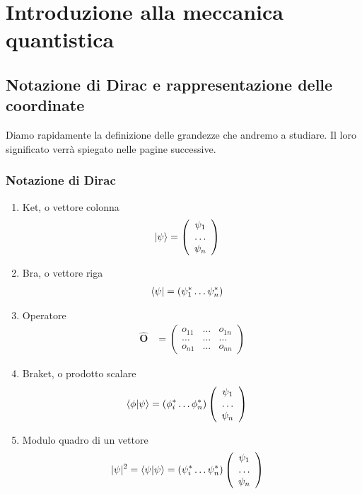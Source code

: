 \chapter{Introduzione alla meccanica quantistica}

\section{Notazione di Dirac e rappresentazione delle coordinate}
Diamo rapidamente la definizione delle grandezze che andremo a studiare. Il loro significato verrà spiegato nelle pagine successive.
\subsection{Notazione di Dirac}
\begin{enumerate}
	\item Ket, o vettore colonna 
		\begin{align}
			\ket{\psi} &= \left(
			\begin{array}{ccc}\psi_1 \\ \dots \\ \psi_n\end{array}
			\right)
		\end{align}
	\item Bra, o vettore riga
		\begin{align}
			\bra{\psi} &= (\psi_1^* \dots \psi_n^*)
		\end{align}
	\item Operatore
		\begin{align}
			\mathbf{\hat O} &= \left(
			\begin{array}{ccc}o_{11} & \dots & o_{1n} \\ \dots & \dots & \dots \\ o_{n1} & \dots & o_{nn}\end{array}
			\right)
		\end{align}
	\item Braket, o prodotto scalare
		\begin{align}
			\braket{\phi | \psi} &= 
			\left(\phi_i^* \dots \phi_n^* \right) \left(
			\begin{array}{ccc}\psi_1 \\ \dots \\ \psi_n\end{array}
			\right)
		\end{align}
	\item Modulo quadro di un vettore
	\begin{align}
		|\psi|^2 &=\braket{\psi | \psi} = 
		\left(\psi_i^* \dots \psi_n^* \right) \left(
		\begin{array}{ccc}\psi_1 \\ \dots \\ \psi_n\end{array}
		\right)
	\end{align}
\end{enumerate}

